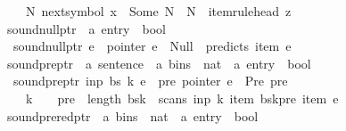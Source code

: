 \begin{isabellebody}
\ \ \ \ {\isacharparenleft}{\kern0pt}{\isasymexists}N{\isachardot}{\kern0pt}\ next{\isacharunderscore}{\kern0pt}symbol\ x\ {\isacharequal}{\kern0pt}\ Some\ N\ {\isasymand}\ N\ {\isacharequal}{\kern0pt}\ item{\isacharunderscore}{\kern0pt}rule{\isacharunderscore}{\kern0pt}head\ z{\isacharparenright}{\kern0pt}{\isachardoublequoteclose}\isanewline
\isanewline
{}\isamarkupfalse%
\ sound{\isacharunderscore}{\kern0pt}null{\isacharunderscore}{\kern0pt}ptr\ {\isacharcolon}{\kern0pt}{\isacharcolon}{\kern0pt}\ {\isachardoublequoteopen}{\isacharprime}{\kern0pt}a\ entry\ {\isasymRightarrow}\ bool{\isachardoublequoteclose}\ \isanewline
\ \ {\isachardoublequoteopen}sound{\isacharunderscore}{\kern0pt}null{\isacharunderscore}{\kern0pt}ptr\ e\ {\isacharequal}{\kern0pt}\ {\isacharparenleft}{\kern0pt}pointer\ e\ {\isacharequal}{\kern0pt}\ Null\ {\isasymlongrightarrow}\ predicts\ {\isacharparenleft}{\kern0pt}item\ e{\isacharparenright}{\kern0pt}{\isacharparenright}{\kern0pt}{\isachardoublequoteclose}\isanewline
\isanewline
{}\isamarkupfalse%
\ sound{\isacharunderscore}{\kern0pt}pre{\isacharunderscore}{\kern0pt}ptr\ {\isacharcolon}{\kern0pt}{\isacharcolon}{\kern0pt}\ {\isachardoublequoteopen}{\isacharprime}{\kern0pt}a\ sentence\ {\isasymRightarrow}\ {\isacharprime}{\kern0pt}a\ bins\ {\isasymRightarrow}\ nat\ {\isasymRightarrow}\ {\isacharprime}{\kern0pt}a\ entry\ {\isasymRightarrow}\ bool{\isachardoublequoteclose}\ \isanewline
\ \ {\isachardoublequoteopen}sound{\isacharunderscore}{\kern0pt}pre{\isacharunderscore}{\kern0pt}ptr\ inp\ bs\ k\ e\ {\isacharequal}{\kern0pt}\ {\isacharparenleft}{\kern0pt}{\isasymforall}pre{\isachardot}{\kern0pt}\ pointer\ e\ {\isacharequal}{\kern0pt}\ Pre\ pre\ {\isasymlongrightarrow}\isanewline
\ \ \ \ k\ {\isachargreater}{\kern0pt}\ {}\ {\isasymand}\ pre\ {\isacharless}{\kern0pt}\ length\ {\isacharparenleft}{\kern0pt}bs{\isacharbang}{\kern0pt}{\isacharparenleft}{\kern0pt}k{\isacharminus}{\kern0pt}{}{\isacharparenright}{\kern0pt}{\isacharparenright}{\kern0pt}\ {\isasymand}\ scans\ inp\ k\ {\isacharparenleft}{\kern0pt}item\ {\isacharparenleft}{\kern0pt}bs{\isacharbang}{\kern0pt}{\isacharparenleft}{\kern0pt}k{\isacharminus}{\kern0pt}{}{\isacharparenright}{\kern0pt}{\isacharbang}{\kern0pt}pre{\isacharparenright}{\kern0pt}{\isacharparenright}{\kern0pt}\ {\isacharparenleft}{\kern0pt}item\ e{\isacharparenright}{\kern0pt}{\isacharparenright}{\kern0pt}{\isachardoublequoteclose}\isanewline
\isanewline
{}\isamarkupfalse%
\ sound{\isacharunderscore}{\kern0pt}prered{\isacharunderscore}{\kern0pt}ptr\ {\isacharcolon}{\kern0pt}{\isacharcolon}{\kern0pt}\ {\isachardoublequoteopen}{\isacharprime}{\kern0pt}a\ bins\ {\isasymRightarrow}\ nat\ {\isasymRightarrow}\ {\isacharprime}{\kern0pt}a\ entry\ {\isasymRightarrow}\ bool{\isachardoublequoteclose}\ \isanewline

\end{isabellebody}
